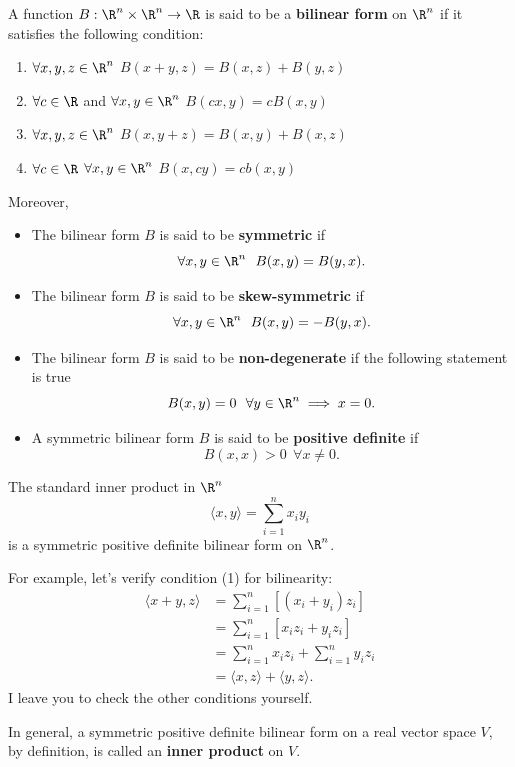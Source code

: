 \begin{definition}
    A function \( B: \R^{n} \times \R^{n} \to \R  \) is said to be a \textbf{bilinear form} on \( \R^{n} \) if it satisfies the following condition:
    \begin{enumerate}
        \item[(1)] \( \forall x,y,z \in \R^{n} \) \( B(x+y,z) = B(x,z) + B(y,z) \)
        \item[(2)] \( \forall c \in \R  \) and \( \forall x,y \in \R^{n} \) \( B(cx,y) = c B(x,y) \)
        \item[(3)] \( \forall x,y,z \in \R^{n} \) \( B(x, y + z) = B(x,y) + B(x,z) \)
        \item[(4)] \( \forall c \in \R  \) \( \forall x,y \in \R^{n} \) \( B(x,cy) = c b(x,y) \)
    \end{enumerate}
\end{definition}

Moreover, 
\begin{itemize}
    \item The bilinear form \( B  \) is said to be \textbf{symmetric} if 
        \[  \forall  x ,y \in \R^{n} \ \  B(x,y) = B(y,x). \]
    \item The bilinear form \( B  \) is said to be \textbf{skew-symmetric} if 
        \[  \forall x,y \in \R^{n} \ \  B(x,y) = - B(y,x). \]
    \item The bilinear form \( B  \) is said to be \textbf{non-degenerate} if the following statement is true
        \[  B(x,y) = 0 \ \  \forall y \in \R^{n} \implies x = 0.  \]
    \item A symmetric bilinear form \( B  \) is said to be \textbf{positive definite} if 
        \[  B(x,x) > 0 \ \ \forall x \neq 0.  \]
\end{itemize}

\begin{eg}
   The standard inner product in \( \R^{n} \) 
   \[  \langle x , y \rangle = \sum_{ i=1  }^{ n } {x}_{i} {y}_{i} \]
   is a symmetric positive definite bilinear form on \( \R^{n} \).

   For example, let's verify condition (1) for bilinearity:
   \begin{align*}
       \langle x + y  , z  \rangle &= \sum_{ i=1  }^{ n } [ ({x}_{i}  + {y}_{i}) {z}_{i} ]  \\
                                   &= \sum_{ i=1  }^{ n } [{x}_{i} {z}_{i} + {y}_{i} {z}_{i} ] \\
                                   &= \sum_{ i=1  }^{ n } {x}_{i} {z}_{i} +  \sum_{ i=1  }^{ n } {y}_{i} {z}_{i} \\
                                   &= \langle x , z  \rangle + \langle y , z \rangle.
   \end{align*}
   I leave you to check the other conditions yourself.

   In general, a symmetric positive definite bilinear form on a real vector space \( V  \), by definition, is called an \textbf{inner product} on \( V  \). 
\end{eg}

